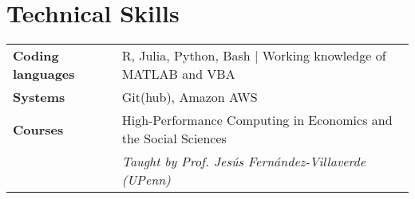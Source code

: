\documentclass[11pt, a4paper]{article}
\begin{document}


 \section*{Technical Skills}
 \begin{tabular}{ll}
    \textbf{Coding languages} & R, Julia, Python, Bash $|$ Working knowledge of MATLAB and VBA \\
    \textbf{Systems} & Git(hub), Amazon AWS \\
    \textbf{Courses} & High-Performance Computing in Economics and the Social Sciences \\
    & \textit{Taught by Prof. Jesús Fernández-Villaverde (UPenn)} \\
     
 \end{tabular}
\end{document}
